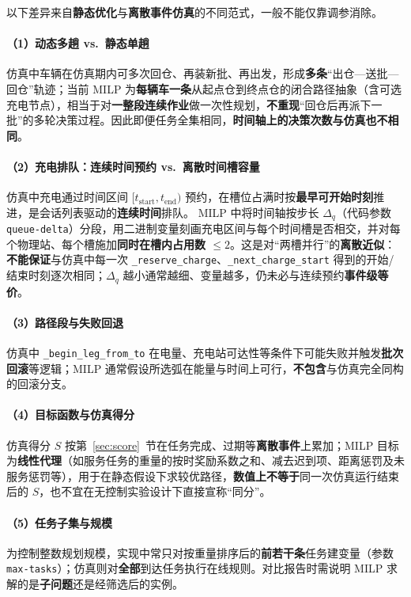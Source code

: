 \documentclass[UTF8,a4paper]{ctexart}
\begin{document}
以下差异来自\textbf{静态优化}与\textbf{离散事件仿真}的不同范式，一般不能仅靠调参消除。

\paragraph{（1）动态多趟 vs.\ 静态单趟}
仿真中车辆在仿真期内可多次回仓、再装新批、再出发，形成\textbf{多条}“出仓—送批—回仓”轨迹；当前 MILP 为\textbf{每辆车一条}从起点仓到终点仓的闭合路径抽象（含可选充电节点），相当于对\textbf{一整段连续作业}做一次性规划，\textbf{不重现}“回仓后再派下一批”的多轮决策过程。因此即便任务全集相同，\textbf{时间轴上的决策次数与仿真也不相同}。

\paragraph{（2）充电排队：连续时间预约 vs.\ 离散时间槽容量}
仿真中充电通过时间区间 $[t_{\mathrm{start}},t_{\mathrm{end}})$ 预约，在槽位占满时按\textbf{最早可开始时刻}推进，是会话列表驱动的\textbf{连续时间}排队。
MILP 中将时间轴按步长 $\Delta_q$（代码参数 \texttt{queue-delta}）分段，用二进制变量刻画充电区间与每个时间槽是否相交，并对每个物理站、每个槽施加\textbf{同时在槽内占用数 $\le 2$}。这是对“两槽并行”的\textbf{离散近似}：\textbf{不能保证}与仿真中每一次 \texttt{\_reserve\_charge}、\texttt{\_next\_charge\_start} 得到的开始/结束时刻逐次相同；$\Delta_q$ 越小通常越细、变量越多，仍未必与连续预约\textbf{事件级等价}。

\paragraph{（3）路径段与失败回退}
仿真中 \texttt{\_begin\_leg\_from\_to} 在电量、充电站可达性等条件下可能失败并触发\textbf{批次回滚}等逻辑；MILP 通常假设所选弧在能量与时间上可行，\textbf{不包含}与仿真完全同构的回滚分支。

\paragraph{（4）目标函数与仿真得分}
仿真得分 $S$ 按第~\ref{sec:score}~节在任务完成、过期等\textbf{离散事件}上累加；MILP 目标为\textbf{线性代理}（如服务任务的重量的按时奖励系数之和、减去迟到项、距离惩罚及未服务惩罚等），用于在静态假设下求较优路径，\textbf{数值上不等于}同一次仿真运行结束后的 $S$，也不宜在无控制实验设计下直接宣称“同分”。

\paragraph{（5）任务子集与规模}
为控制整数规划规模，实现中常只对按重量排序后的\textbf{前若干条}任务建变量（参数 \texttt{max-tasks}）；仿真则对\textbf{全部}到达任务执行在线规则。对比报告时需说明 MILP 求解的是\textbf{子问题}还是经筛选后的实例。
\end{document}
